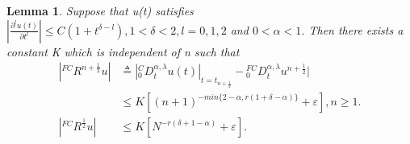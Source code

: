 \documentclass[10pt, reqno]{amsart}
\newtheorem{lmm}{\bf Lemma}
\newenvironment{lemma}{\begin{lmm}}{\end{lmm}}
\theoremstyle{remark}
\theoremstyle{definition}
\numberwithin{table}{section}
\begin{document}
\begin{lemma} \label{FRu}
Suppose that u(t) satisfies $\left|\frac{\partial^l u(t)}{\partial t^l}\right| \leq C(1+t^{\delta-l}),  1<\delta<2,  l=0, 1, 2$ and $0< \alpha < 1$. Then there exists a constant K which is independent of n such that
\begin{equation}
    \begin{aligned}
        |{}^{FC}R^{n+\frac{1}{2}}u|&\triangleq{}|{}^C_0D^{\alpha, \lambda}_tu(t)|_{t=t_{n+\frac{1}{2}}}- { }_0^{FC}D_t^{\alpha,  \lambda} u^{n+\frac{1}{2}}|\\
        &\leq K[(n+1)^{-min\{2-\alpha, r(1+\delta-\alpha)\}}+\varepsilon],  n\geq1. \\
        |{}^{FC}R^{\frac{1}{2}}u|&\leq K[N^{-r(\delta+1-\alpha)}+\varepsilon].  \label{Fhalf}
    \end{aligned}
\end{equation}
\end{lemma}
\end{document}
